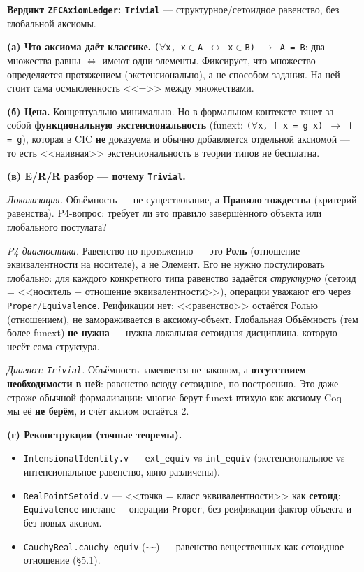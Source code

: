 \documentclass[11pt,a4paper]{article}
\begin{document}
\textbf{Вердикт \texttt{ZFCAxiom\allowbreak{}Ledger}: \texttt{Trivial}} --- структурное/сетоидное равенство, без глобальной аксиомы.

\textbf{(а) Что аксиома даёт классике.} \texttt{($\forall$x,\allowbreak{} x$\in$A $\leftrightarrow$ x$\in$B) $\to$ A = B}: два множества равны $\Longleftrightarrow$ имеют одни элементы. Фиксирует, что множество определяется протяжением (экстенсионально), а не способом задания. На ней стоит сама осмысленность <<=>> между множествами.

\textbf{(б) Цена.} Концептуально минимальна. Но в формальном контексте тянет за собой \textbf{функциональную экстенсиональность} (funext: \texttt{($\forall$x,\allowbreak{} f x = g x) $\to$ f = g}), которая в CIC \textbf{не} доказуема и обычно добавляется отдельной аксиомой --- то есть <<наивная>> экстенсиональность в теории типов не бесплатна.

\textbf{(в) E/R/R разбор --- почему \texttt{Trivial}.}

\emph{Локализация.} Объёмность --- не существование, а \textbf{Правило тождества} (критерий равенства). P4-вопрос: требует ли это правило завершённого объекта или глобального постулата?

\emph{P4-диагностика.} Равенство-по-протяжению --- это \textbf{Роль} (отношение эквивалентности на носителе), а не Элемент. Его не нужно постулировать глобально: для каждого конкретного типа равенство задаётся \emph{структурно} (сетоид = <<носитель + отношение эквивалентности>>), операции уважают его через \texttt{Proper}/\texttt{Equivalence}. Реификации нет: <<равенство>> остаётся Ролью (отношением), не замораживается в аксиому-объект. Глобальная Объёмность (тем более funext) \textbf{не нужна} --- нужна локальная сетоидная дисциплина, которую несёт сама структура.

\emph{Диагноз: \texttt{Trivial}.} Объёмность заменяется не законом, а \textbf{отсутствием необходимости в ней}: равенство всюду сетоидное, по построению. Это даже строже обычной формализации: многие берут funext втихую как аксиому Coq --- мы её \textbf{не берём}, и счёт аксиом остаётся 2.

\textbf{(г) Реконструкция (точные теоремы).}
\begin{itemize}
\item \texttt{Intensional\allowbreak{}Identity.v} --- \texttt{ext\_\allowbreak{}equiv} vs \texttt{int\_\allowbreak{}equiv} (экстенсиональное vs интенсиональное равенство, явно различены).
\item \texttt{Real\allowbreak{}Point\allowbreak{}Setoid.v} --- <<точка = класс эквивалентности>> как \textbf{сетоид}: \texttt{Equivalence}-инстанс + операции \texttt{Proper}, без реификации фактор-объекта и без новых аксиом.
\item \texttt{Cauchy\allowbreak{}Real.cauchy\_\allowbreak{}equiv} (\texttt{\textasciitilde{}\textasciitilde{}}) --- равенство вещественных как сетоидное отношение (\S{}5.1).
\end{itemize}
\end{document}
